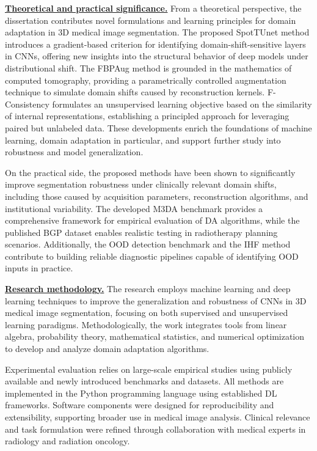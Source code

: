 \underline{\textbf{Theoretical and practical significance.}}
From a theoretical perspective, the dissertation contributes novel formulations and learning principles for domain adaptation in 3D medical image segmentation. The proposed SpotTUnet method introduces a gradient-based criterion for identifying domain-shift-sensitive layers in CNNs, offering new insights into the structural behavior of deep models under distributional shift. The FBPAug method is grounded in the mathematics of computed tomography, providing a parametrically controlled augmentation technique to simulate domain shifts caused by reconstruction kernels. F-Consistency formulates an unsupervised learning objective based on the similarity of internal representations, establishing a principled approach for leveraging paired but unlabeled data. These developments enrich the foundations of machine learning, domain adaptation in particular, and support further study into robustness and model generalization.

On the practical side, the proposed methods have been shown to significantly improve segmentation robustness under clinically relevant domain shifts, including those caused by acquisition parameters, reconstruction algorithms, and institutional variability. The developed M3DA benchmark provides a comprehensive framework for empirical evaluation of DA algorithms, while the published BGP dataset enables realistic testing in radiotherapy planning scenarios. Additionally, the OOD detection benchmark and the IHF method contribute to building reliable diagnostic pipelines capable of identifying OOD inputs in practice. %

\underline{\textbf{Research methodology.}} The research employs machine learning and deep learning techniques to improve the generalization and robustness of CNNs in 3D medical image segmentation, focusing on both supervised and unsupervised learning paradigms. Methodologically, the work integrates tools from linear algebra, probability theory, mathematical statistics, and numerical optimization to develop and analyze domain adaptation algorithms.

Experimental evaluation relies on large-scale empirical studies using publicly available and newly introduced benchmarks and datasets. All methods are implemented in the Python programming language using established DL frameworks. Software components were designed for reproducibility and extensibility, supporting broader use in medical image analysis. Clinical relevance and task formulation were refined through collaboration with medical experts in radiology and radiation oncology.

